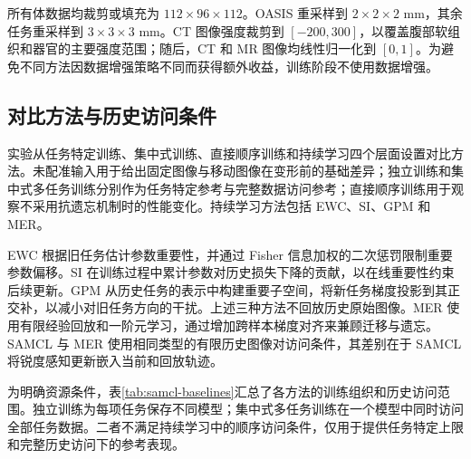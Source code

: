 所有体数据均裁剪或填充为
$112\times96\times112$。OASIS 重采样到
$2\times2\times2$ mm，其余任务重采样到
$3\times3\times3$ mm。CT 图像强度裁剪到
$[-200,300]$，以覆盖腹部软组织和器官的主要强度范围；随后，CT 和 MR 图像均线性归一化到 $[0,1]$。为避免不同方法因数据增强策略不同而获得额外收益，训练阶段不使用数据增强。

\subsection{对比方法与历史访问条件}
\label{subsubsec:samcl-baselines}

实验从任务特定训练、集中式训练、直接顺序训练和持续学习四个层面设置对比方法。未配准输入用于给出固定图像与移动图像在变形前的基础差异；独立训练和集中式多任务训练分别作为任务特定参考与完整数据访问参考；直接顺序训练用于观察不采用抗遗忘机制时的性能变化。持续学习方法包括 EWC、SI、GPM 和 MER。

EWC 根据旧任务估计参数重要性，并通过 Fisher 信息加权的二次惩罚限制重要参数偏移\cite{kirkpatrick2017ewc}。SI 在训练过程中累计参数对历史损失下降的贡献，以在线重要性约束后续更新\cite{method_regu_si}。GPM 从历史任务的表示中构建重要子空间，将新任务梯度投影到其正交补，以减小对旧任务方向的干扰\cite{saha2021gpm}。上述三种方法不回放历史原始图像。MER 使用有限经验回放和一阶元学习，通过增加跨样本梯度对齐来兼顾迁移与遗忘\cite{riemer2019mer}。SAMCL 与 MER 使用相同类型的有限历史图像对访问条件，其差别在于 SAMCL 将锐度感知更新嵌入当前和回放轨迹。

为明确资源条件，表\ref{tab:samcl-baselines}汇总了各方法的训练组织和历史访问范围。独立训练为每项任务保存不同模型；集中式多任务训练在一个模型中同时访问全部任务数据。二者不满足持续学习中的顺序访问条件，仅用于提供任务特定上限和完整历史访问下的参考表现。

